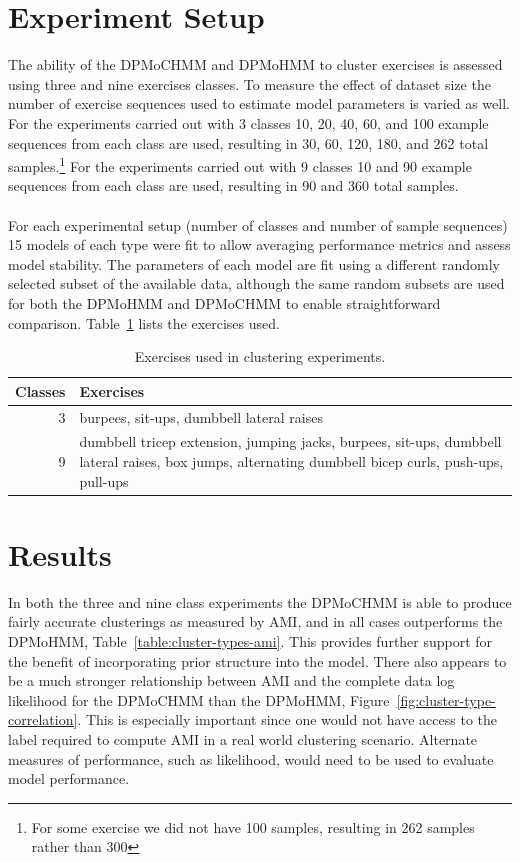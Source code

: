 \documentclass[12pt]{report}
\newcommand{\1}[0]{\mathbbm{1}}
\begin{document}
\section{Experiment Setup}
The ability of the \ac{DPMoCHMM} and \ac{DPMoHMM} to cluster exercises is assessed
using three and nine exercises classes. To measure the effect of dataset size the number of
exercise sequences used to estimate model parameters is varied as well. For the experiments
carried out with 3 classes 10, 20, 40, 60, and 100 example sequences from each class are used,
resulting in 30, 60, 120, 180, and 262 total samples.\footnote{For some exercise we did not
have 100 samples, resulting in 262 samples rather than 300} For the experiments carried out with
9 classes 10 and 90 example sequences from each class are used, resulting in 90 and 360 total samples.
\\\\
For each experimental setup (number of classes and number of sample sequences)
15 models of each type were fit to allow averaging performance metrics and assess model stability.
The parameters of each model are fit using a different randomly selected subset of the available data,
although the same random subsets are used for both the \ac{DPMoHMM} and \ac{DPMoCHMM} to enable
straightforward comparison. Table~\ref{table:cluster-experiment} lists the exercises used.

\begin{table}[H]
    \centering
    \begin{tabular}{r | p{8cm}}\hline
    \textbf{Classes} & \textbf{Exercises} \\\hline
    3 &  burpees, sit-ups, dumbbell lateral raises\\\hline
    9 & dumbbell tricep extension, jumping jacks, burpees, sit-ups, dumbbell lateral raises, box jumps, alternating dumbbell bicep curls, push-ups, pull-ups\\
    \end{tabular}
    \caption[Exercises used in clustering experiments]{
        Exercises used in clustering experiments.
    }
    \label{table:cluster-experiment}
\end{table}

\section{Results}
In both the three and nine class experiments the \ac{DPMoCHMM}
is able to produce fairly accurate clusterings as measured by
\ac{AMI}, and in all cases outperforms the \ac{DPMoHMM}, Table~\ref{table:cluster-types-ami}.
This provides further support for the benefit of incorporating prior
structure into the model. There also appears to be a much stronger
relationship between \ac{AMI} and the complete data log likelihood for the
\ac{DPMoCHMM} than the \ac{DPMoHMM}, Figure~\ref{fig:cluster-type-correlation}.
This is especially important since one would not have access to the label required
to compute \ac{AMI} in a real world clustering scenario. Alternate measures of performance,
such as likelihood, would need to be used to evaluate model performance.
\end{document}
